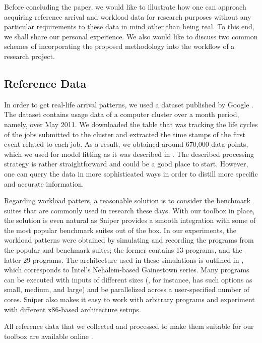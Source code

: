 Before concluding the paper, we would like to illustrate how one can approach
acquiring reference arrival and workload data for research purposes without any
particular requirements to these data in mind other than being real. To this
end, we shall share our personal experience. We also would like to discuss two
common schemes of incorporating the proposed methodology into the workflow of a
research project.

\subsection{Reference Data} 

In order to get real-life arrival patterns, we used a dataset published by
Google \cite{google}. The dataset contains usage data of a computer cluster over
a month period, namely, over May 2011. We downloaded the table that was tracking
the life cycles of the jobs submitted to the cluster and extracted the time
stamps of the first event related to each job. As a result, we obtained around
670,000 data points, which we used for model fitting as it was described in
. The described processing strategy is rather straightforward and
could be a good place to start. However, one can query the data in more
sophisticated ways in order to distill more specific and accurate information.

Regarding workload patters, a reasonable solution is to consider the benchmark
suites that are commonly used in research these days. With our toolbox in place,
the solution is even natural as Sniper provides a smooth integration with some
of the most popular benchmark suites out of the box. In our experiments, the
workload patterns were obtained by simulating and recording the programs from
the popular  \cite{bienia2011} and  \cite{cpu2006}
benchmark suites; the former contains 13 programs, and the latter 29 programs.
The architecture used in these simulations is outlined in , which
corresponds to Intel's Nehalem-based Gainestown series. Many programs can be
executed with inputs of different sizes (, for instance, has such
options as small, medium, and large) and be parallelized across a user-specified
number of cores. Sniper also makes it easy to work with arbitrary programs and
experiment with different x86-based architecture setups.

All reference data that we collected and processed to make them suitable for our
toolbox are available online \cite{sources}.

